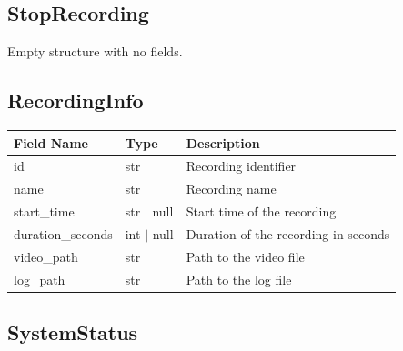 \documentclass[12pt, titlepage]{article}
\begin{document}
\subsection{StopRecording}

Empty structure with no fields.

\subsection{RecordingInfo}

\begin{center}
  \begin{tabular}{p{4cm} p{3cm} p{8cm}}
    \toprule
    \textbf{Field Name} & \textbf{Type} & \textbf{Description}                 \\
    \midrule
    id                  & str           & Recording identifier                 \\
    name                & str           & Recording name                       \\
    start\_time         & str $|$ null  & Start time of the recording          \\
    duration\_seconds   & int $|$ null  & Duration of the recording in seconds \\
    video\_path         & str           & Path to the video file               \\
    log\_path           & str           & Path to the log file                 \\
    \bottomrule
  \end{tabular}
\end{center}

\subsection{SystemStatus}
\end{document}
